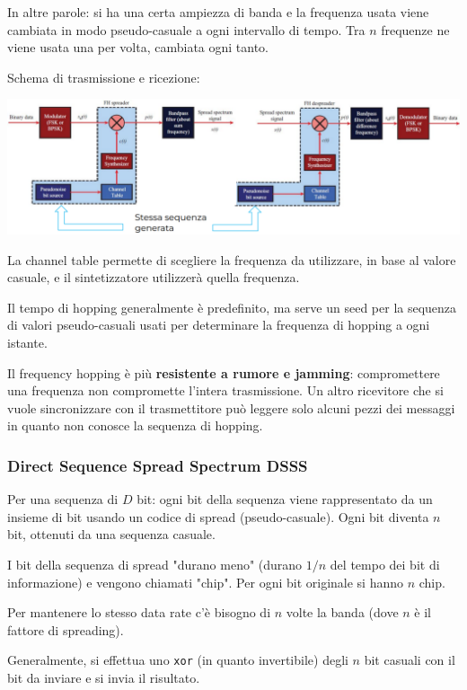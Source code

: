 In altre parole: si ha una certa ampiezza di banda e la frequenza usata viene cambiata in modo pseudo-casuale a ogni intervallo di tempo. Tra $n$ frequenze ne viene usata una per volta, cambiata ogni tanto.

Schema di trasmissione e ricezione:
\begin{center}
	\includegraphics[width=\linewidth]{img/wireless/fhss1}
\end{center}

La channel table permette di scegliere la frequenza da utilizzare, in base al valore casuale, e il sintetizzatore utilizzerà quella frequenza. 

Il tempo di hopping generalmente è predefinito, ma serve un seed per la sequenza di valori pseudo-casuali usati per determinare la frequenza di hopping a ogni istante.

Il frequency hopping è più \textbf{resistente a rumore e jamming}: compromettere una frequenza non compromette l'intera trasmissione. Un altro ricevitore che si vuole sincronizzare con il trasmettitore può leggere solo alcuni pezzi dei messaggi in quanto non conosce la sequenza di hopping. 

\subsubsection{Direct Sequence Spread Spectrum DSSS}

Per una sequenza di $D$ bit: ogni bit della sequenza viene rappresentato da un insieme di bit usando un codice di spread (pseudo-casuale). Ogni bit diventa $n$ bit, ottenuti da una sequenza casuale.

I bit della sequenza di spread "durano meno" (durano $1/n$ del tempo dei bit di informazione) e vengono chiamati "chip". Per ogni bit originale si hanno $n$ chip.

Per mantenere lo stesso data rate c'è bisogno di $n$ volte la banda (dove $n$ è il fattore di spreading).

Generalmente, si effettua uno \texttt{xor} (in quanto invertibile) degli $n$ bit casuali con il bit da inviare e si invia il risultato. 


